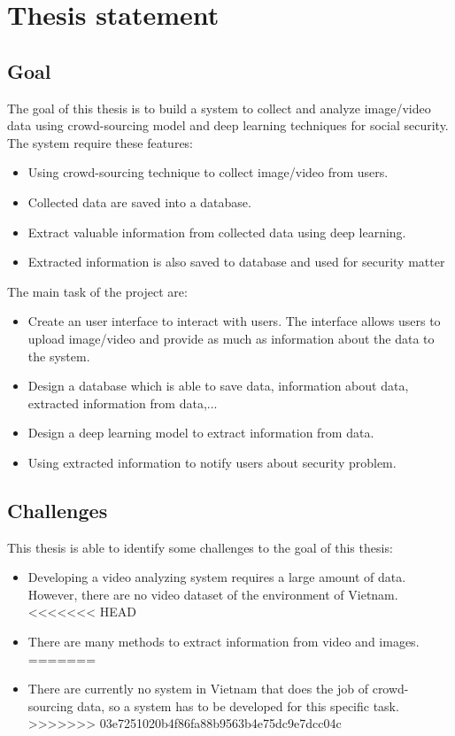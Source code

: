\section{Thesis statement}
\subsection{Goal}
The goal of this thesis is to build a system to collect and analyze image/video data using crowd-sourcing model and deep learning techniques for social security. The system require these features:
\begin{itemize}
	\item Using crowd-sourcing technique to collect image/video from users.
	\item Collected data are saved into a database.
	\item Extract valuable information from collected data using deep learning.
	\item Extracted information is also saved to database and used for security matter
\end{itemize} 
The main task of the project are:
\begin{itemize}
	\item Create an user interface to interact with users. The interface allows users to upload image/video and provide as much as information about the data to the system.
	\item Design a database which is able to save data, information about data, extracted information from data,...
	\item Design a deep learning model to extract information from data.
	\item Using extracted information to notify users about security problem.
\end{itemize} 
\subsection{Challenges}
This thesis is able to identify some challenges to the goal of this thesis:
\begin{itemize}
	\item Developing a video analyzing system requires a large amount of data. However, there are no video dataset of the environment of Vietnam.
<<<<<<< HEAD
	\item There are many methods to extract information from video and images.
=======
	\item There are currently no system in Vietnam that does the job of crowd-sourcing data, so a system has to be developed for this specific task.
>>>>>>> 03e7251020b4f86fa88b9563b4e75dc9e7dcc04c
\end{itemize}
